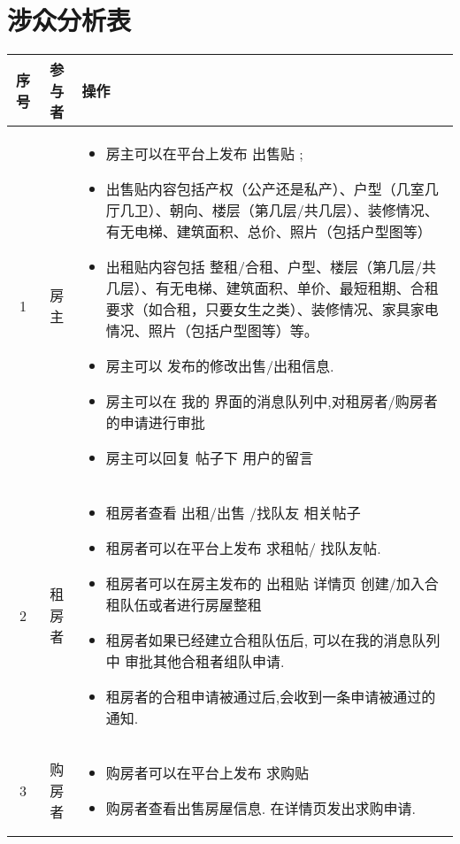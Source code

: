 \section{涉众分析表}

\begin{table}[htbp]
    \footnotesize
    \begin{center}  
    \begin{tabular}{|c|c|p{11cm}|}  
    \hline  
    序号 & 参与者 & 操作 \\ \hline  
    1 & 房主 &     \begin{itemize}
        \item 房主可以在平台上发布 出售贴 ;
        \item 出售贴内容包括产权（公产还是私产）、户型（几室几厅几卫）、朝向、楼层（第几层/共几层）、装修情况、有无电梯、建筑面积、总价、照片（包括户型图等）
        \item 出租贴内容包括 整租/合租、户型、楼层（第几层/共几层）、有无电梯、建筑面积、单价、最短租期、合租要求（如合租，只要女生之类）、装修情况、家具家电情况、照片（包括户型图等）等。
        \item 房主可以 发布的修改出售/出租信息.
        \item 房主可以在 我的 界面的消息队列中,对租房者/购房者的申请进行审批
        \item  房主可以回复 帖子下 用户的留言
     
    \end{itemize} \\ \hline  

    2 & 租房者 &     \begin{itemize}
        \item 租房者查看 出租/出售 /找队友 相关帖子
        \item 租房者可以在平台上发布 求租帖/ 找队友帖.
        \item 租房者可以在房主发布的 出租贴 详情页 创建/加入合租队伍或者进行房屋整租
        \item 租房者如果已经建立合租队伍后, 可以在我的消息队列中 审批其他合租者组队申请.
        \item 租房者的合租申请被通过后,会收到一条申请被通过的通知. 
     
    \end{itemize}
\\ \hline  

    3 & 购房者 & \begin{itemize}

        \item 购房者可以在平台上发布 求购贴
        \item 购房者查看出售房屋信息. 在详情页发出求购申请.
     

\end{itemize}
\end{tabular}
\end{center}
\end{table}
